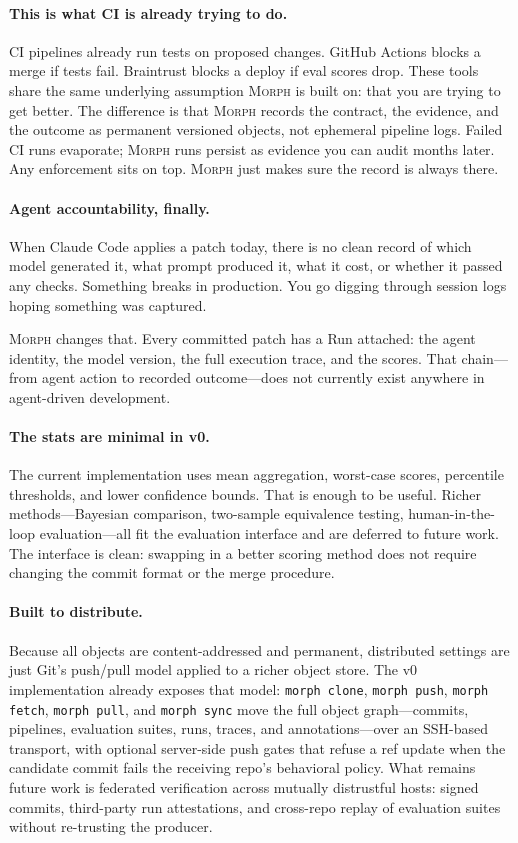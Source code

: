 \documentclass{article}
\begin{document}
\paragraph{This is what CI is already trying to do.}
CI pipelines already run tests on proposed changes. GitHub Actions blocks a
merge if tests fail. Braintrust blocks a deploy if eval scores drop. These
tools share the same underlying assumption \textsc{Morph} is built on: that
you are trying to get better. The difference is that \textsc{Morph} records
the contract, the evidence, and the outcome as permanent versioned objects,
not ephemeral pipeline logs. Failed CI runs evaporate; \textsc{Morph} runs
persist as evidence you can audit months later. Any enforcement sits on top.
\textsc{Morph} just makes sure the record is always there.

\paragraph{Agent accountability, finally.}
When Claude Code applies a patch today, there is no clean record of which
model generated it, what prompt produced it, what it cost, or whether it
passed any checks. Something breaks in production. You go digging through
session logs hoping something was captured.

\textsc{Morph} changes that. Every committed patch has a Run attached: the
agent identity, the model version, the full execution trace, and the scores.
That chain---from agent action to recorded outcome---does not currently exist
anywhere in agent-driven development.

\paragraph{The stats are minimal in v0.}
The current implementation uses mean aggregation, worst-case scores, percentile
thresholds, and lower confidence bounds. That is enough to be useful. Richer
methods---Bayesian comparison, two-sample equivalence testing, human-in-the-loop
evaluation---all fit the evaluation interface and are deferred to future work.
The interface is clean: swapping in a better scoring method does not require
changing the commit format or the merge procedure.

\paragraph{Built to distribute.}
Because all objects are content-addressed and permanent, distributed settings
are just Git's push/pull model applied to a richer object store. The v0
implementation already exposes that model: \texttt{morph clone},
\texttt{morph push}, \texttt{morph fetch}, \texttt{morph pull}, and
\texttt{morph sync} move the full object graph---commits, pipelines,
evaluation suites, runs, traces, and annotations---over an SSH-based
transport, with optional server-side push gates that refuse a ref update
when the candidate commit fails the receiving repo's behavioral policy.
What remains future work is federated verification across mutually
distrustful hosts: signed commits, third-party run attestations, and
cross-repo replay of evaluation suites without re-trusting the producer.
\end{document}
